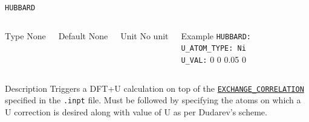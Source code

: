 \documentclass[xcolor=dvipsnames,t]{beamer}
\begin{document}
\begin{frame}[allowframebreaks]{\texttt{HUBBARD}} \label{HUBBARD}
\vspace*{-12pt}
\begin{columns}
\begin{block}{Type}
None
\end{block}

\begin{block}{Default}
None
\end{block}

\begin{block}{Unit}
No unit
\end{block}

\begin{block}{Example}
\texttt{HUBBARD: \\}
\texttt{U\_ATOM\_TYPE: Ni \\}
\texttt{U\_VAL:} 0 0 0.05 0 \\
\end{block}
\end{columns}

\begin{block}{Description}
Triggers a DFT+U calculation on top of the \hyperlink{EXCHANGE_CORRELATION}{\texttt{EXCHANGE\_CORRELATION}} specified in the \texttt{.inpt} file. Must be followed by specifying the atoms on which a U correction is desired along with value of U as per Dudarev's scheme.
\end{block}

\end{frame}
\end{document}

